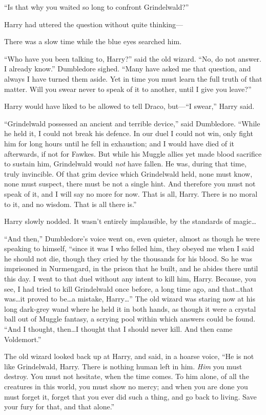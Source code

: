 “Is that why you waited so long to confront Grindelwald?”

Harry had uttered the question without quite thinking—

There was a slow time while the blue eyes searched him.

“Who have you been talking to, Harry?” said the old wizard. “No, do not answer. I already know.” Dumbledore sighed. “Many have asked me that question, and always I have turned them aside. Yet in time you must learn the full truth of that matter. Will you swear never to speak of it to another, until I give you leave?”

Harry would have liked to be allowed to tell Draco, but—“I swear,” Harry said.

“Grindelwald possessed an ancient and terrible device,” said Dumbledore. “While he held it, I could not break his defence. In our duel I could not win, only fight him for long hours until he fell in exhaustion; and I would have died of it afterwards, if not for Fawkes. But while his Muggle allies yet made blood sacrifice to sustain him, Grindelwald would \emph{not} have fallen. He was, during that time, truly invincible. Of that grim device which Grindelwald held, none must know, none must suspect, there must be not a single hint. And therefore you must not speak of it, and I will say no more for now. That is all, Harry. There is no moral to it, and no wisdom. That is all there is.”

Harry slowly nodded. It wasn’t entirely implausible, by the standards of magic…

“And then,” Dumbledore’s voice went on, even quieter, almost as though he were speaking to himself, “since it was I who felled him, they obeyed me when I said he should not die, though they cried by the thousands for his blood. So he was imprisoned in Nurmengard, in the prison that he built, and he abides there until this day. I went to that duel without any intent to kill him, Harry. Because, you see, I had tried to kill Grindelwald once before, a long time ago, and that…that was…it proved to be…a mistake, Harry…” The old wizard was staring now at his long dark-grey wand where he held it in both hands, as though it were a crystal ball out of Muggle fantasy, a scrying pool within which answers could be found. “And I thought, then…I thought that I should never kill. And then came Voldemort.”

The old wizard looked back up at Harry, and said, in a hoarse voice, “He is not like Grindelwald, Harry. There is nothing human left in him. \emph{Him} you must destroy. You must not hesitate, when the time comes. To him alone, of all the creatures in this world, you must show no mercy; and when you are done you must forget it, forget that you ever did such a thing, and go back to living. Save your fury for that, and that alone.”

